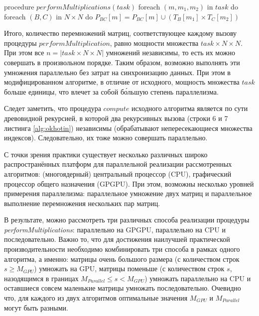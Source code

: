 \documentclass[a4paper,12pt]{article}  %
\theoremstyle{definition}
\theoremstyle{remark}
\begin{document}
\begin{algorithm}[caption={Процедура, использующаяся для перемножения матриц}, label={alg:multiplicate_full}] 
procedure $performMultiplications(task)$
  foreach $(m,m_1,m_2)$ in $task$ do
    foreach $(B,C)$ in $N \times N$ do
      $P_{BC}[m] = P_{BC}[m] \cup (T_{B}[m_1] \times T_{C}[m_2])$
\end{algorithm}

Итого, количество перемножений матриц, соответствующее каждому вызову процедуры $performMultiplication$, равно мощности множества $task \times N \times N$. При этом все $n = |task \times N \times N|$ умножений независимы, то есть их можно совершать в произвольном порядке. Таким образом, возможно выполнять эти умножения параллельно без затрат на синхронизацию данных. При этом в модифицированном алгоритме, в отличие от исходного, мощность множества $task$ больше единицы, что влечет за собой б\'{о}льшую степень параллелизма. 

Следет заметить, что процедура $compute$ исходного алгоритма является по сути древовидной рекурсией, в которой два рекурсивных вызова (строки 6 и 7 листинга \ref{alg:okhotin}) независимы (обрабатывают непересекающиеся множества индексов). Следовательно, их тоже можно совершать параллельно.

С точки зрения практики существует несколько различных широко распространённых платформ для параллельной реализации рассмотренных алгоритмов: (многоядерный) центральный процессор (CPU), графический процессор общего назначения (GPGPU). При этом, возможны несколько уровней примерения параллелизма: параллельное умножение двух матриц и параллельное выполнение перемножения нескольких пар матриц. 

В результате, можно рассмотреть три различных способа реализации процедуры \linebreak \textit{performMultiplications}: параллельно на GPGPU, параллельно на CPU и последовательно. Важно то, что для достижения наилучшей практической производительности необходимо комбинировать три способа в рамках одного алгоритма, а именно: матрицы очень большого размера (с количеством строк $s \geqslant M_{GPU}$) умножать на GPU, матрицы поменьше (с количеством строк $s$, назодящимся в границах $M_{Parallel} \leqslant s < M_{GPU}$) умножать параллельно на CPU и оставшиеся совсем маленькие матрицы умножать последовательно. Очевидно что, для каждого из двух алгоритмов оптимальные значения $M_{GPU}$ и $M_{Parallel}$ могут быть разными.
\end{document}
